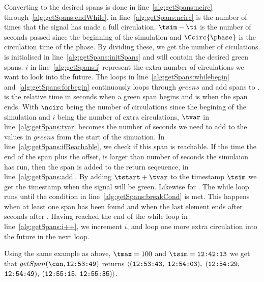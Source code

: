 Converting \greens to the desired spans is done in line~\ref{alg:getSpans:ncirc} through~\ref{alg:getSpans:endWhile}.
\ncirc in line~\ref{alg:getSpans:ncirc} is the number of times that the signal has made a full circulation.
$\tsim-\ti$ is the number of seconds passed since the beginning of the simulation and $\Ccirc{\phase}$ is the circulation time of the phase. 
By dividing these, we get the number of ciculations.
\spans is initialised in line~\ref{alg:getSpans:initSpans} and will contain the desired green spans.
$i$ in line~\ref{alg:getSpans:i} represent the extra number of circulations we want to look into the future.
The loops in line~\ref{alg:getSpans:whilebegin} and~\ref{alg:getSpans:forbegin} continuously loops through $greens$ and add spans to \spans.
\tstart is the relative time in seconds when a green span begins and \tend is when the span ends. %
With $\ncirc$ being the number of circulations since the begining of the simulation and $i$ being the number of extra circulations, $\tvar$ in line~\ref{alg:getSpans:tvar} becomes the number of seconds we need to add to the values in $greens$ from the start of the simuation.
In line~\ref{alg:getSpans:ifReachable}, we check if this span is reachable.
If the time the end of the span plus the offset, \tvar is larger than number of seconds the simulaion has run, then the span is added to the return seqeuence, \spans in line~\ref{alg:getSpans:add}.
By adding $\tstart + \tvar$ to the timestamp $\tsim$ we get the timestamp when the signal will be green. Likewise for \tend.
The while loop runs until the condition in line~\ref{alg:getSpans:breakCond} is met.
This happens when at least one span has been found and when the last element ends after \tmax seconds after \ti.
Having reached the end of the while loop in line~\ref{alg:getSpans:i++}, we increment $i$, and loop one more extra circulation into the future in the next loop.

Using the same example as above, $\tmax=100$ and $\tsim=\verb#12:42:13#$ we get that $getSpan(\con, \verb#12:53:49#)$ returns $\langle(\verb#12:53:43#,$ $\verb#12:54:03#),$ $(\verb#12:54:29#,$ $\verb#12:54:49#),$ $(\verb#12:55:15#,$ $\verb#12:55:35#)\rangle$.%

